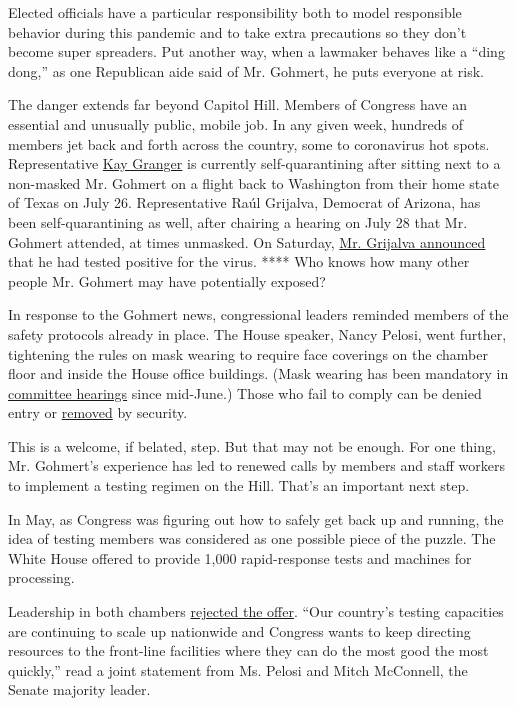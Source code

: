 Elected officials have a particular responsibility both to model
responsible behavior during this pandemic and to take extra precautions
so they don't become super spreaders. Put another way, when a lawmaker
behaves like a ``ding dong,'' as one Republican aide said of Mr.
Gohmert, he puts everyone at risk.

The danger extends far beyond Capitol Hill. Members of Congress have an
essential and unusually public, mobile job. In any given week, hundreds
of members jet back and forth across the country, some to coronavirus
hot spots. Representative
\href{https://thehill.com/homenews/house/509647-texas-rep-kay-granger-self-quarantining-after-sitting-next-to-gohmert-on}{Kay
Granger} is currently self-quarantining after sitting next to a
non-masked Mr. Gohmert on a flight back to Washington from their home
state of Texas on July 26. Representative Raúl Grijalva, Democrat of
Arizona, has been self-quarantining as well, after chairing a hearing on
July 28 that Mr. Gohmert attended, at times unmasked. On Saturday,
\href{https://twitter.com/RepRaulGrijalva/status/1289637013394583553}{Mr.
Grijalva announced} that he had tested positive for the virus. **** Who
knows how many other people Mr. Gohmert may have potentially exposed?

In response to the Gohmert news, congressional leaders reminded members
of the safety protocols already in place. The House speaker, Nancy
Pelosi, went further, tightening the rules on mask wearing to require
face coverings on the chamber floor and inside the House office
buildings. (Mask wearing has been mandatory in
\href{https://www.rollcall.com/2020/06/17/face-masks-required-in-house-committee-hearings-congressional-physician-says/}{committee
hearings} since mid-June.) Those who fail to comply can be denied entry
or
\href{https://www.cnn.com/2020/07/29/politics/pelosi-mask-mandate-capitol/index.html}{removed}
by security.

This is a welcome, if belated, step. But that may not be enough. For one
thing, Mr. Gohmert's experience has led to renewed calls by members and
staff workers to implement a testing regimen on the Hill. That's an
important next step.

In May, as Congress was figuring out how to safely get back up and
running, the idea of testing members was considered as one possible
piece of the puzzle. The White House offered to provide 1,000
rapid-response tests and machines for processing.

Leadership in both chambers
\href{https://www.speaker.gov/newsroom/5220}{rejected the offer}. ``Our
country's testing capacities are continuing to scale up nationwide and
Congress wants to keep directing resources to the front-line facilities
where they can do the most good the most quickly,'' read a joint
statement from Ms. Pelosi and Mitch McConnell, the Senate majority
leader.

